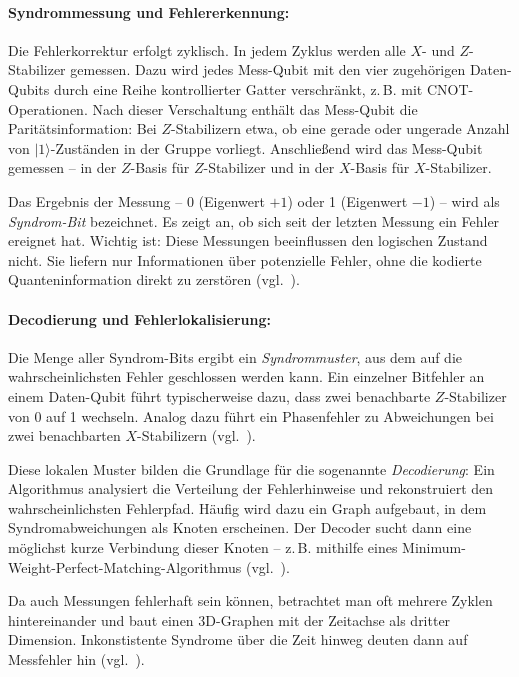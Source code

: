 \paragraph{Syndrommessung und Fehlererkennung:}

Die Fehlerkorrektur erfolgt zyklisch. In jedem Zyklus werden alle \(X\)- und \(Z\)-Stabilizer gemessen. Dazu wird jedes Mess-Qubit mit den vier zugehörigen Daten-Qubits durch eine Reihe kontrollierter Gatter verschränkt, z.\,B. mit CNOT-Operationen. Nach dieser Verschaltung enthält das Mess-Qubit die Paritätsinformation: Bei \(Z\)-Stabilizern etwa, ob eine gerade oder ungerade Anzahl von \( |1\rangle \)-Zuständen in der Gruppe vorliegt. Anschließend wird das Mess-Qubit gemessen – in der \(Z\)-Basis für \(Z\)-Stabilizer und in der \(X\)-Basis für \(X\)-Stabilizer.

Das Ergebnis der Messung – 0 (Eigenwert \(+1\)) oder 1 (Eigenwert \(-1\)) – wird als \emph{Syndrom-Bit} bezeichnet. Es zeigt an, ob sich seit der letzten Messung ein Fehler ereignet hat. Wichtig ist: Diese Messungen beeinflussen den logischen Zustand nicht. Sie liefern nur Informationen über potenzielle Fehler, ohne die kodierte Quanteninformation direkt zu zerstören (vgl.~\cite[5-6]{fowler_surface_2012}).
\medskip
\paragraph{Decodierung und Fehlerlokalisierung:}

Die Menge aller Syndrom-Bits ergibt ein \emph{Syndrommuster}, aus dem auf die wahrscheinlichsten Fehler geschlossen werden kann. Ein einzelner Bitfehler an einem Daten-Qubit führt typischerweise dazu, dass zwei benachbarte \(Z\)-Stabilizer von 0 auf 1 wechseln. Analog dazu führt ein Phasenfehler zu Abweichungen bei zwei benachbarten \(X\)-Stabilizern (vgl.~\cite[7]{fowler_surface_2012}).

Diese lokalen Muster bilden die Grundlage für die sogenannte \emph{Decodierung}: Ein Algorithmus analysiert die Verteilung der Fehlerhinweise und rekonstruiert den wahrscheinlichsten Fehlerpfad. Häufig wird dazu ein Graph aufgebaut, in dem Syndromabweichungen als Knoten erscheinen. Der Decoder sucht dann eine möglichst kurze Verbindung dieser Knoten – z.\,B. mithilfe eines Minimum-Weight-Perfect-Matching-Algorithmus (vgl.~\cite[10-11]{fowler_surface_2012}).

Da auch Messungen fehlerhaft sein können, betrachtet man oft mehrere Zyklen hintereinander und baut einen 3D-Graphen mit der Zeitachse als dritter Dimension. Inkonstistente Syndrome über die Zeit hinweg deuten dann auf Messfehler hin (vgl.~\cite[2]{wu_micro_2025}).
\medskip
